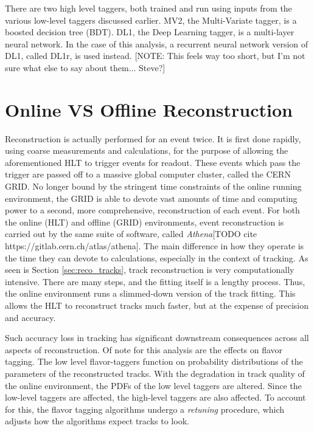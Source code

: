             There are two high level taggers, both trained and run using inputs from the various low-level taggers discussed earlier.
            MV2, the Multi-Variate tagger, is a boosted decision tree (BDT).
            DL1, the Deep Learning tagger, is a multi-layer neural network.
            In the case of this analysis, a recurrent neural network version of DL1, called DL1r, is used instead.
            \cite{bjet_id_and_performance}
            \cite{btagging_optimisation}
            [NOTE: This feels way too short, but I'm not sure what else to say about them... Steve?]

    \FloatBarrier
    \section{Online VS Offline Reconstruction}

        Reconstruction is actually performed for an event twice.
        It is first done rapidly, using coarse measurements and calculations,
            for the purpose of allowing the aforementioned HLT to trigger events for readout.
        These events which pass the trigger are passed off to a massive global computer cluster, called the CERN GRID.
        No longer bound by the stringent time constraints of the online running environment,
            the GRID is able to devote vast amounts of time and computing power to a second, 
            more comprehensive, reconstruction of each event.
        For both the online (HLT) and offline (GRID) environments, event reconstruction is carried out by the same suite of software,
            called \textit{Athena}[TODO cite https://gitlab.cern.ch/atlas/athena].
        The main difference in how they operate is the time they can devote to calculations, especially in the context of tracking.
        As seen is Section \ref{sec:reco_tracks}, track reconstruction is very computationally intensive.
        There are many steps, and the fitting itself is a lengthy process.
        Thus, the online environment runs a slimmed-down version of the track fitting.
        This allows the HLT to reconstruct tracks much faster, but at the expense of precision and accuracy.

        Such accuracy loss in tracking has significant downstream consequences across all aspects of reconstruction.
        Of note for this analysis are the effects on flavor tagging.
        The low level flavor-taggers function on probability distributions of the parameters of the reconstructed tracks.
        With the degradation in track quality of the online environment, the PDFs of the low level taggers are altered.
        Since the low-level taggers are affected, the high-level taggers are also affected.
        To account for this, the flavor tagging algorithms undergo a \textit{retuning} procedure, 
            which adjusts how the algorithms expect tracks to look.

